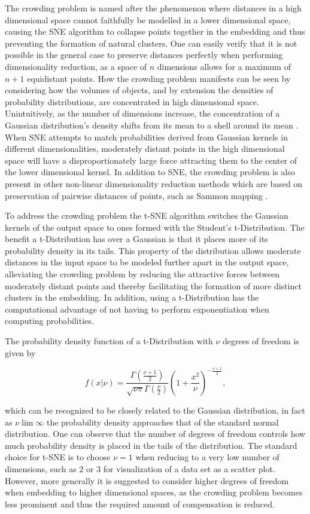 The crowding problem is named after the phenomenon where distances in a high dimensional space cannot faithfully be modelled in a lower dimensional space, causing the SNE algorithm to collapse points together in the embedding and thus preventing the formation of natural clusters. One can easily verify that it is not possible in the general case to preserve distances perfectly when performing dimensionality reduction, as a space of $n$ dimensions allows for a maximum of $n+1$ equidistant points. How the crowding problem manifests can be seen by considering how the volumes of objects, and by extension the densities of probability distributions, are concentrated in high dimensional space. Unintuitively, as the number of dimensions increase, the concentration of a Gaussian distribution's density shifts from its mean to a shell around its mean \cite[p.~50]{high_dimensional_probability}. When SNE attempts to match probabilities derived from Gaussian kernels in different dimensionalities, moderately distant points in the high dimensional space will have a disproportionately large force attracting them to the center of the lower dimensional kernel. In addition to SNE, the crowding problem is also present in other non-linear dimensionality reduction methods which are based on preservation of pairwise distances of points, such as Sammon mapping \cite{tsne}.

To address the crowding problem the t-SNE algorithm switches the Gaussian kernels of the output space to ones formed with the Student's t-Distribution. The benefit a t-Distribution has over a Gaussian is that it places more of its probability density in its tails. This property of the distribution allows moderate distances in the input space to be modeled further apart in the output space, alleviating the crowding problem by reducing the attractive forces between moderately distant points and thereby facilitating the formation of more distinct clusters in the embedding. In addition, using a t-Distribution has the computational advantage of not having to perform exponentiation when computing probabilities.

The probability density function of a t-Distribution with $\nu$ degrees of freedom is given by

$$f(x \vert \nu) = \frac{\Gamma(\frac{\nu + 1}{2})}{\sqrt{\nu \pi} \Gamma(\frac{\nu}{2})} (1 + \frac{x^2}{\nu})^{-\frac{\nu + 1}{2}},$$

which can be recognized to be closely related to the Gaussian distribution, in fact as $\nu \lim \infty$ the probability density approaches that of the standard normal distribution. One can observe that the number of degrees of freedom controls how much probability density is placed in the tails of the distribution. The standard choice for t-SNE is to choose $\nu = 1$ when reducing to a very low number of dimensions, such as 2 or 3 for visualization of a data set as a scatter plot. However, more generally it is suggested to consider higher degrees of freedom when embedding to higher dimensional spaces, as the crowding problem becomes less prominent and thus the required amount of compensation is reduced.

